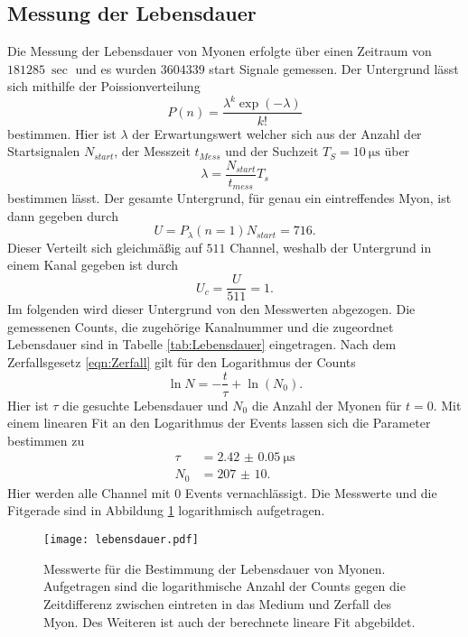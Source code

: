 \subsection{Messung der Lebensdauer}
Die Messung der Lebensdauer von Myonen erfolgte über einen Zeitraum von $\SI{181285}{\sec}$ und es wurden $3604339$ start Signale gemessen. 
Der Untergrund lässt sich mithilfe der Poissionverteilung 
\begin{equation*}
    P(n) = \frac{\lambda^k \exp(-\lambda)}{k!}
\end{equation*}
bestimmen. Hier ist $\lambda$ der Erwartungswert welcher sich aus der Anzahl der Startsignalen $N_{start}$, der Messzeit $t_{Mess}$ und der Suchzeit $T_S = \SI{10}{\micro\second}$ über 
\begin{equation*}
    \lambda = \frac{N_{start}}{t_{mess}} T_s  
\end{equation*}
bestimmen lässt. Der gesamte Untergrund, für genau ein eintreffendes Myon, ist dann gegeben durch 
\begin{equation*}
    U = P_{\lambda}(n=1) N_{start} = \num{716}  .
\end{equation*}
Dieser Verteilt sich gleichmäßig auf $511$ Channel, weshalb der Untergrund in einem Kanal gegeben ist durch 
\begin{equation*}
    U_c = \frac{U}{511} =\num{1}  .
\end{equation*}
Im folgenden wird dieser Untergrund von den Messwerten abgezogen.
Die gemessenen Counts, die zugehörige Kanalnummer und die zugeordnet Lebensdauer sind in Tabelle \ref{tab:Lebensdauer} eingetragen.
Nach dem Zerfallsgesetz \ref{eqn:Zerfall} gilt für den Logarithmus der Counts 
\begin{equation*}
    \ln N = -\frac{t}{\tau} + \ln(N_0).
\end{equation*}
Hier ist $\tau $ die gesuchte Lebensdauer und $N_0$ die Anzahl der Myonen für $t=0$. Mit einem linearen Fit an den Logarithmus der Events lassen sich die Parameter bestimmen zu 
\begin{align*}
    \tau &= \SI{2.42(5)}{\micro\second} \\
    N_0 &= \num{207(10)}.
\end{align*}
Hier werden alle Channel mit $0$ Events vernachlässigt.
Die Messwerte und die Fitgerade sind in Abbildung \ref{fig:Lebensdauer} logarithmisch aufgetragen.
\begin{figure}
    \centering 
    \texttt{[image: lebensdauer.pdf]}
    \caption{Messwerte für die Bestimmung der Lebensdauer von Myonen. Aufgetragen sind die logarithmische Anzahl der Counts gegen die Zeitdifferenz zwischen eintreten in das Medium und Zerfall des Myon. Des Weiteren ist auch der berechnete lineare Fit abgebildet. }
    \label{fig:Lebensdauer}
\end{figure}

